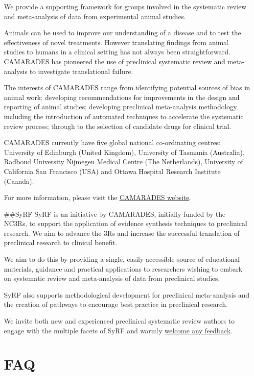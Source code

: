 \documentclass[
]{book}
\begin{document}
We provide a supporting framework for groups involved in the systematic review and meta-analysis of data from experimental animal studies.

Animals can be used to improve our understanding of a disease and to test the effectiveness of novel treatments. However translating findings from animal studies to humans in a clinical setting has not always been straightforward. CAMARADES has pioneered the use of preclinical systematic review and meta-analysis to investigate translational failure.

The interests of CAMARADES range from identifying potential sources of bias in animal work; developing recommendations for improvements in the design and reporting of animal studies; developing preclinical meta-analysis methodology including the introduction of automated techniques to accelerate the systematic review process; through to the selection of candidate drugs for clinical trial.

CAMARADES currently have five global national co-ordinating centres: University of Edinburgh (United Kingdom), University of Tasmania (Australia), Radboud University Nijmegen Medical Centre (The Netherlands), University of California San Francisco (USA) and Ottawa Hospital Research Institute (Canada).

For more information, please visit the \href{https://www.ed.ac.uk/clinical-brain-sciences/research/camarades}{CAMARADES website}.

\#\#SyRF
SyRF is an initiative by CAMARADES, initially funded by the NC3Rs, to support the application of evidence synthesis techniques to preclinical research. We aim to advance the 3Rs and increase the successful translation of preclinical research to clinical benefit.

We aim to do this by providing a single, easily accessible source of educational materials, guidance and practical applications to researchers wishing to embark on systematic review and meta-analysis of data from preclinical studies.

SyRF also supports methodological development for preclinical meta-analysis and the creation of pathways to encourage best practice in preclinical research.

We invite both new and experienced preclinical systematic review authors to engage with the multiple facets of SyRF and warmly \href{mailto:syrf.info@ed.ac.uk}{welcome any feedback}.

\hypertarget{faq}{%
\chapter{FAQ}\label{faq}}
\end{document}
